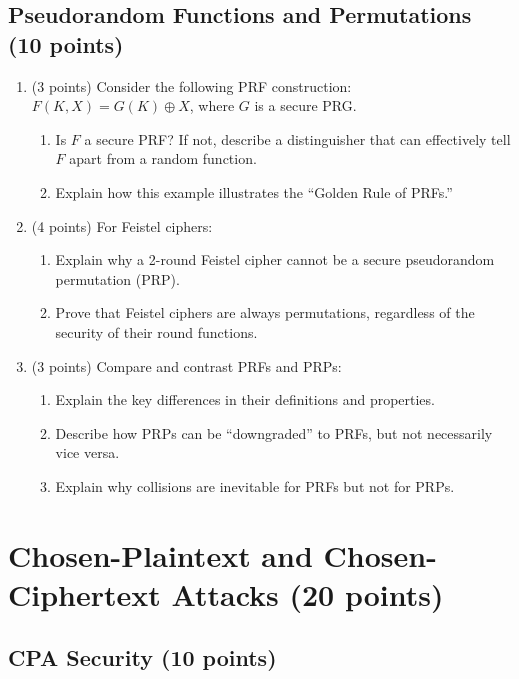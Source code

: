 \documentclass[10pt,a4paper,american]{exam}
\begin{document}
\subsection{Pseudorandom Functions and Permutations (10 points)}

\begin{enumerate}
	\item (3 points) Consider the following PRF construction: $F(K, X) = G(K) \oplus X$, where $G$ is a secure PRG.
	      \begin{enumerate}
		      \item Is $F$ a secure PRF? If not, describe a distinguisher that can effectively tell $F$ apart from a random function.
		      \item Explain how this example illustrates the ``Golden Rule of PRFs.''
	      \end{enumerate}

	\item (4 points) For Feistel ciphers:
	      \begin{enumerate}
		      \item Explain why a 2-round Feistel cipher cannot be a secure pseudorandom permutation (PRP).
		      \item Prove that Feistel ciphers are always permutations, regardless of the security of their round functions.
	      \end{enumerate}

	\item (3 points) Compare and contrast PRFs and PRPs:
	      \begin{enumerate}
		      \item Explain the key differences in their definitions and properties.
		      \item Describe how PRPs can be ``downgraded'' to PRFs, but not necessarily vice versa.
		      \item Explain why collisions are inevitable for PRFs but not for PRPs.
	      \end{enumerate}
\end{enumerate}

\section{Chosen-Plaintext and Chosen-Ciphertext Attacks (20 points)}

\subsection{CPA Security (10 points)}
\end{document}
